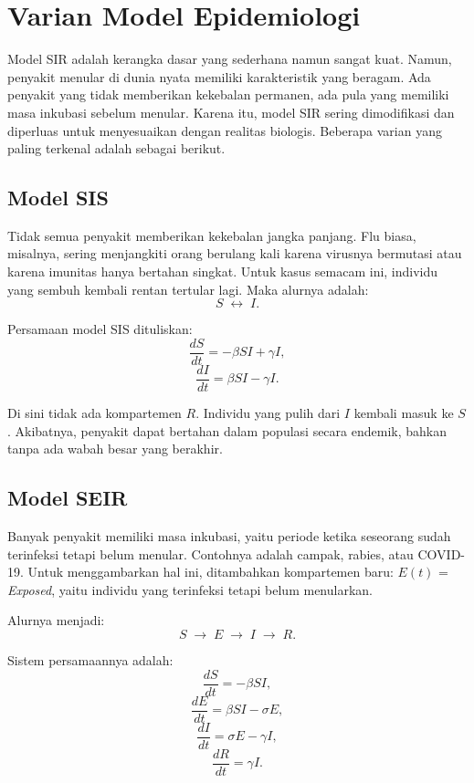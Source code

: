 \documentclass{bukumjh}
\begin{document}
\section{Varian Model Epidemiologi}

Model SIR adalah kerangka dasar yang sederhana namun sangat kuat. Namun, penyakit menular di dunia nyata memiliki karakteristik yang beragam. Ada penyakit yang tidak memberikan kekebalan permanen, ada pula yang memiliki masa inkubasi sebelum menular. Karena itu, model SIR sering dimodifikasi dan diperluas untuk menyesuaikan dengan realitas biologis. Beberapa varian yang paling terkenal adalah sebagai berikut.

\subsection{Model SIS}

Tidak semua penyakit memberikan kekebalan jangka panjang. Flu biasa, misalnya, sering menjangkiti orang berulang kali karena virusnya bermutasi atau karena imunitas hanya bertahan singkat. Untuk kasus semacam ini, individu yang sembuh kembali rentan tertular lagi. Maka alurnya adalah:
\[
S \;\longleftrightarrow\; I.
\]

Persamaan model SIS dituliskan:
\[
\frac{dS}{dt} = -\beta S I + \gamma I,
\]
\[
\frac{dI}{dt} = \beta S I - \gamma I.
\]

Di sini tidak ada kompartemen $R$. Individu yang pulih dari $I$ kembali masuk ke $S$. Akibatnya, penyakit dapat bertahan dalam populasi secara endemik, bahkan tanpa ada wabah besar yang berakhir.

\subsection{Model SEIR}

Banyak penyakit memiliki {\jsg masa inkubasi}, yaitu periode ketika seseorang sudah terinfeksi tetapi belum menular. Contohnya adalah campak, rabies, atau COVID-19. Untuk menggambarkan hal ini, ditambahkan kompartemen baru: $E(t)$ = \textit{Exposed}, yaitu individu yang terinfeksi tetapi belum menularkan.

Alurnya menjadi:
\[
S \;\longrightarrow\; E \;\longrightarrow\; I \;\longrightarrow\; R.
\]

Sistem persamaannya adalah:
\[
\frac{dS}{dt} = -\beta S I,
\]
\[
\frac{dE}{dt} = \beta S I - \sigma E,
\]
\[
\frac{dI}{dt} = \sigma E - \gamma I,
\]
\[
\frac{dR}{dt} = \gamma I.
\]
\end{document}
